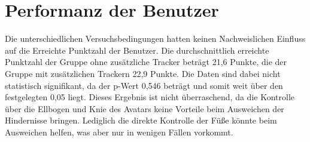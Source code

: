 \section{Performanz der Benutzer}
Die unterschiedlichen Versuchsbedingungen hatten keinen Nachweislichen Einfluss auf die Erreichte Punktzahl der Benutzer. Die durchschnittlich erreichte Punktzahl der Gruppe ohne zusätzliche Tracker beträgt 21,6 Punkte, die der Gruppe mit zusätzlichen Trackern 22,9 Punkte. Die Daten sind dabei nicht statistisch signifikant, da der p-Wert 0,546 beträgt und somit weit über den festgelegten 0,05 liegt. Dieses Ergebnis ist nicht überraschend, da die Kontrolle über die Ellbogen und Knie des Avatars keine Vorteile beim Ausweichen der Hindernisse bringen. Lediglich die direkte Kontrolle der Füße könnte beim Ausweichen helfen, was aber nur in wenigen Fällen vorkommt.















